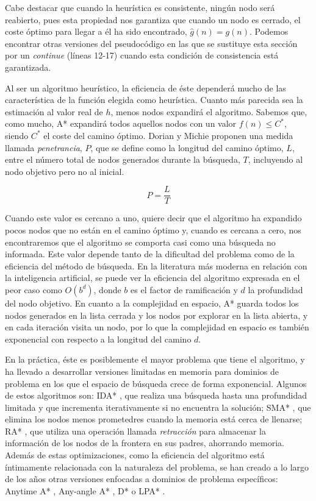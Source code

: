 \documentclass[a4paper,12pt]{article}
\begin{document}
Cabe destacar que cuando la heurística es consistente, ningún nodo será reabierto, pues esta propiedad nos garantiza que cuando un nodo es cerrado, el coste óptimo para llegar a él ha sido encontrado, $\hat{g}(n) = g(n)$. Podemos encontrar otras versiones del pseudocódigo en las que se sustituye esta sección por un \textit{continue} (líneas 12-17) cuando esta condición de consistencia está garantizada.

Al ser un algoritmo heurístico, la eficiencia de éste dependerá mucho de las característica de la función elegida como heurística. Cuanto más parecida sea la estimación al valor real de $h$, menos nodos expandirá el algoritmo. Sabemos que, como mucho, A* expandirá todos aquellos nodos con un valor $f(n) \leq C^*$, siendo $C^*$ el coste del camino óptimo. Dorian y Michie \cite{doran_experiments_1997} proponen una medida llamada \textit{penetrancia}, $P$, que se define como la longitud del camino óptimo, $L$, entre el número total de nodos generados durante la búsqueda, $T$, incluyendo al nodo objetivo pero no al inicial.

\begin{equation}
P = \frac{L}{T}
\end{equation}

\noindent Cuando este valor es cercano a uno, quiere decir que el algoritmo ha expandido pocos nodos que no están en el camino óptimo y, cuando es cercana a cero, nos encontraremos que el algoritmo se comporta casi como una búsqueda no informada. Este valor depende tanto de la dificultad del problema como de la eficiencia del método de búsqueda. En la literatura más moderna en relación con la inteligencia artificial, se puede ver la eficiencia del algoritmo expresada en el peor caso como $O(b^d)$, donde $b$ es el factor de ramificación y $d$ la profundidad del nodo objetivo. En cuanto a la complejidad en espacio, A* guarda todos los nodos generados en la lista cerrada y los nodos por explorar en la lista abierta, y en cada iteración visita un nodo, por lo que la complejidad en espacio es también exponencial con respecto a la longitud del camino $d$.

En la práctica, éste es posiblemente el mayor problema que tiene el algoritmo, y ha llevado a desarrollar versiones limitadas en memoria para dominios de problema en los que el espacio de búsqueda crece de forma exponencial. Algunos de estos algoritmos son: IDA* \cite{korf1985depth}, que realiza una búsqueda hasta una profundidad limitada y que incrementa iterativamente si no encuentra la solución; SMA* \cite{russell1992cient}, que elimina los nodos menos prometedres cuando la memoria está cerca de llenarse; RA* \cite{evett1995massively}, que utiliza una operación llamada \textit{retracción} para almacenar la información de los nodos de la frontera en sus padres, ahorrando memoria. Además de estas optimizaciones, como la eficiencia del algoritmo está íntimamente relacionada con la naturaleza del problema, se han creado a lo largo de los años otras versiones enfocadas a dominios de problema específicos: Anytime A* \cite{hansen2007anytime}, Any-angle A* \cite{daniel2010theta}, D* \cite{stentz1994optimal} o LPA* \cite{koenig2001incremental}.
\end{document}
